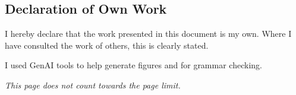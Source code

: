 \begin{titlepage}
\begin{abstract}
Activation steering modifies the internal representations of large language models at inference time to control their behaviour, but existing methods either require manual tuning of where and how strongly to intervene, or learn full intervention vectors at significant parameter cost. This project proposes \emph{sparse activation steering}, a hybrid that fixes steering directions from data and then learns only \emph{which} model components to steer and \emph{how much}, using a small number of trainable scalar parameters. We will evaluate the method on multiple behavioural benchmarks, comparing against previous targeted steering techniques and more general parameter-efficient fine-tuning baselines.
\end{abstract}

\section*{Declaration of Own Work}

I hereby declare that the work presented in this document is my own. Where I have consulted the work of others, this is clearly stated.

I used GenAI tools to help generate figures and for grammar checking.

\vfill
\noindent\textit{This page does not count towards the page limit.}
\end{titlepage}
